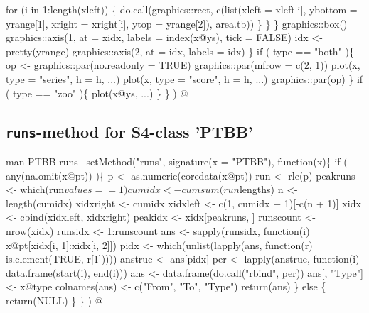 \documentclass[a4paper]{article}
\begin{document}
                    for (i in 1:length(xleft)) \{
                        do.call(graphics::rect, c(list(xleft = xleft[i],
                                                       ybottom = yrange[1],
                                                       xright = xright[i],
                                                       ytop = yrange[2]),
                                                  area.tb))
                    \}
                \}
            \}
            graphics::box()
            graphics::axis(1, at = xidx, labels = index(x@ys),
                           tick = FALSE)
            idx <- pretty(yrange)
            graphics::axis(2, at = idx, labels = idx)
        \}
        if ( type == "both" )\{
            op <- graphics::par(no.readonly = TRUE)
            graphics::par(mfrow = c(2, 1))
            plot(x, type = "series", h = h, ...)
            plot(x, type = "score", h = h, ...)
            graphics::par(op)
        \}
        if ( type == "zoo" )\{
            plot(x@ys, ...)
        \}
    \}
)
\nwendcode{}@

\subsection{\texttt{runs}-method for S4-class 'PTBB'}

\nwenddocs{}\endmoddef\let\nwnotused=\nwoutput{}
\LA{}man-PTBB-runs~{\nwtagstyle{}}\RA{}
setMethod("runs",
          signature(x = "PTBB"), function(x)\{
              if ( any(na.omit(x@pt)) )\{
                  p <- as.numeric(coredata(x@pt))
                  run <- rle(p)
                  peakruns <- which(run$values == 1)
                  cumidx <- cumsum(run$lengths)
                  n <- length(cumidx)
                  xidxright <- cumidx
                  xidxleft <- c(1, cumidx + 1)[-c(n + 1)]
                  xidx <- cbind(xidxleft, xidxright)
                  peakidx <- xidx[peakruns, ]
                  runscount <- nrow(xidx)
                  runsidx <- 1:runscount
                  ans <- sapply(runsidx, function(i)
                      x@pt[xidx[i, 1]:xidx[i, 2]])
                  pidx <- which(unlist(lapply(ans, function(r)
                      is.element(TRUE, r[1]))))
                  anstrue <- ans[pidx]
                  per <- lapply(anstrue, function(i)
                      data.frame(start(i), end(i)))
                  ans <- data.frame(do.call("rbind", per))
                  ans[, "Type"] <- x@type
                  colnames(ans) <- c("From", "To", "Type")
                  return(ans)
              \} else \{
                  return(NULL)
              \}
          \}
)
\nwnotused{PtbbMethods.R}\nwendcode{}@
\end{document}
